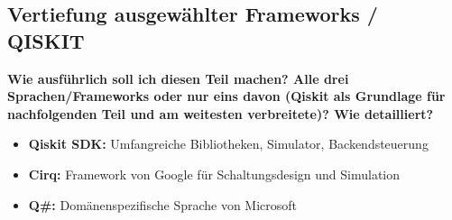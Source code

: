 \subsection{Vertiefung ausgewählter Frameworks / QISKIT}

\textbf{Wie ausführlich soll ich diesen Teil machen? Alle drei Sprachen/Frameworks oder nur eins davon (Qiskit als Grundlage für nachfolgenden Teil und am weitesten verbreitete)? Wie detailliert?}
\begin{itemize}
    \item \textbf{Qiskit SDK:} Umfangreiche Bibliotheken, Simulator, Backendsteuerung
    \item \textbf{Cirq:} Framework von Google für Schaltungsdesign und Simulation
    \item \textbf{Q\#:} Domänenspezifische Sprache von Microsoft
\end{itemize}

